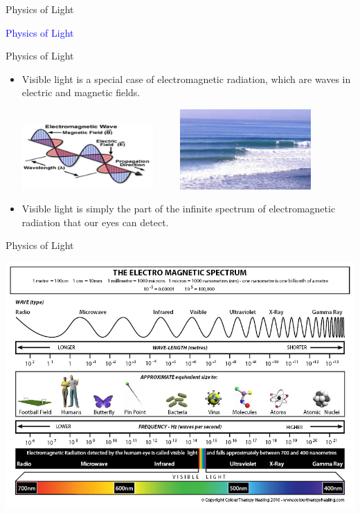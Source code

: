 \documentclass{beamer}
\begin{document}
\begin{frame}{Physics of Light}
   \begin{center}
      \Huge \textcolor{blue}{Physics of Light}
   \end{center}
\end{frame}

\begin{frame}{Physics of Light}
   \begin{itemize}
      \item Visible light is a special case of electromagnetic radiation, which are waves in electric and magnetic fields.
      \begin{center}
         \includegraphics[width=5cm]{figures/emwaves.png}
         ~ ~ ~
         \includegraphics[width=5cm]{figures/oceanwaves.jpg}
      \end{center}
      \item Visible light is simply the part of the infinite spectrum of electromagnetic radiation that our eyes can detect.
   \end{itemize}
\end{frame}

\begin{frame}{Physics of Light}
\begin{center}
   \includegraphics[width=\textwidth]{figures/emspectrum.jpg}
\end{center}
\end{frame}
\end{document}
